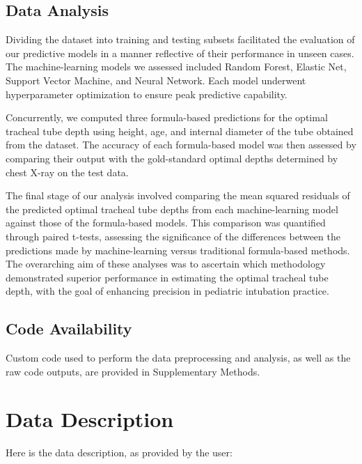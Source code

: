 \documentclass[11pt]{article}
\begin{document}
\subsection*{Data Analysis}
Dividing the dataset into training and testing subsets facilitated the evaluation of our predictive models in a manner reflective of their performance in unseen cases. The machine-learning models we assessed included Random Forest, Elastic Net, Support Vector Machine, and Neural Network. Each model underwent hyperparameter optimization to ensure peak predictive capability. 

Concurrently, we computed three formula-based predictions for the optimal tracheal tube depth using height, age, and internal diameter of the tube obtained from the dataset. The accuracy of each formula-based model was then assessed by comparing their output with the gold-standard optimal depths determined by chest X-ray on the test data.

The final stage of our analysis involved comparing the mean squared residuals of the predicted optimal tracheal tube depths from each machine-learning model against those of the formula-based models. This comparison was quantified through paired t-tests, assessing the significance of the differences between the predictions made by machine-learning versus traditional formula-based methods. The overarching aim of these analyses was to ascertain which methodology demonstrated superior performance in estimating the optimal tracheal tube depth, with the goal of enhancing precision in pediatric intubation practice.\subsection*{Code Availability}

Custom code used to perform the data preprocessing and analysis, as well as the raw code outputs, are provided in Supplementary Methods.






\clearpage
\appendix

\section{Data Description} \label{sec:data_description} Here is the data description, as provided by the user:
\end{document}
